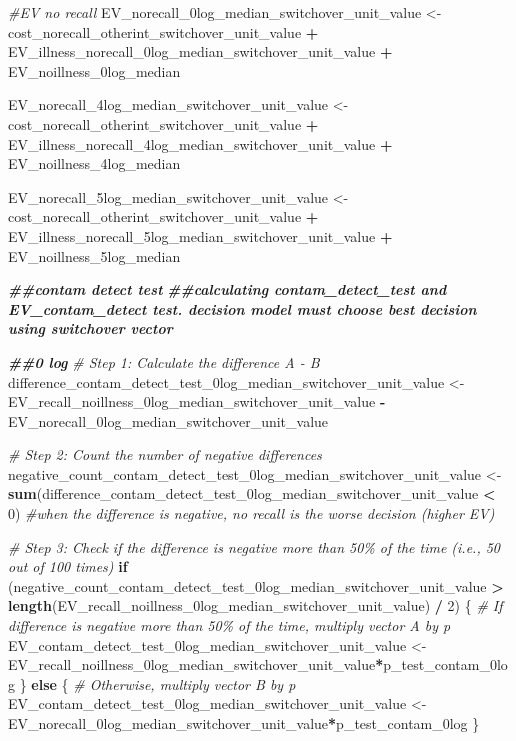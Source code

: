 \documentclass[
]{article}
\newenvironment{Shaded}{\begin{snugshade}}{\end{snugshade}}
\newcommand{\CommentTok}[1]{\textcolor[rgb]{0.56,0.35,0.01}{\textit{#1}}}
\newcommand{\ControlFlowTok}[1]{\textcolor[rgb]{0.13,0.29,0.53}{\textbf{#1}}}
\newcommand{\DecValTok}[1]{\textcolor[rgb]{0.00,0.00,0.81}{#1}}
\newcommand{\DocumentationTok}[1]{\textcolor[rgb]{0.56,0.35,0.01}{\textbf{\textit{#1}}}}
\newcommand{\FunctionTok}[1]{\textcolor[rgb]{0.13,0.29,0.53}{\textbf{#1}}}
\newcommand{\NormalTok}[1]{#1}
\newcommand{\OtherTok}[1]{\textcolor[rgb]{0.56,0.35,0.01}{#1}}
\newcommand{\SpecialCharTok}[1]{\textcolor[rgb]{0.81,0.36,0.00}{\textbf{#1}}}
\begin{document}
\begin{Shaded}
\begin{Highlighting}[]
\CommentTok{\#EV no recall}
\NormalTok{EV\_norecall\_0log\_median\_switchover\_unit\_value }\OtherTok{\textless{}{-}}\NormalTok{ cost\_norecall\_otherint\_switchover\_unit\_value }\SpecialCharTok{+}\NormalTok{ EV\_illness\_norecall\_0log\_median\_switchover\_unit\_value }\SpecialCharTok{+}\NormalTok{ EV\_noillness\_0log\_median}

\NormalTok{EV\_norecall\_4log\_median\_switchover\_unit\_value }\OtherTok{\textless{}{-}}\NormalTok{ cost\_norecall\_otherint\_switchover\_unit\_value }\SpecialCharTok{+}\NormalTok{ EV\_illness\_norecall\_4log\_median\_switchover\_unit\_value }\SpecialCharTok{+}\NormalTok{ EV\_noillness\_4log\_median}

\NormalTok{EV\_norecall\_5log\_median\_switchover\_unit\_value }\OtherTok{\textless{}{-}}\NormalTok{ cost\_norecall\_otherint\_switchover\_unit\_value }\SpecialCharTok{+}\NormalTok{ EV\_illness\_norecall\_5log\_median\_switchover\_unit\_value }\SpecialCharTok{+}\NormalTok{ EV\_noillness\_5log\_median}


\DocumentationTok{\#\#contam detect test}
\DocumentationTok{\#\#calculating contam\_detect\_test and EV\_contam\_detect test. decision model must choose best decision using switchover vector}

\DocumentationTok{\#\#0 log}
\CommentTok{\# Step 1: Calculate the difference A {-} B}
\NormalTok{difference\_contam\_detect\_test\_0log\_median\_switchover\_unit\_value }\OtherTok{\textless{}{-}}\NormalTok{ EV\_recall\_noillness\_0log\_median\_switchover\_unit\_value }\SpecialCharTok{{-}}\NormalTok{ EV\_norecall\_0log\_median\_switchover\_unit\_value}

\CommentTok{\# Step 2: Count the number of negative differences}
\NormalTok{negative\_count\_contam\_detect\_test\_0log\_median\_switchover\_unit\_value }\OtherTok{\textless{}{-}} \FunctionTok{sum}\NormalTok{(difference\_contam\_detect\_test\_0log\_median\_switchover\_unit\_value }\SpecialCharTok{\textless{}} \DecValTok{0}\NormalTok{) }\CommentTok{\#when the difference is negative, no recall is the worse decision (higher EV)}

\CommentTok{\# Step 3: Check if the difference is negative more than 50\% of the time (i.e., 50 out of 100 times)}
\ControlFlowTok{if}\NormalTok{ (negative\_count\_contam\_detect\_test\_0log\_median\_switchover\_unit\_value }\SpecialCharTok{\textgreater{}} \FunctionTok{length}\NormalTok{(EV\_recall\_noillness\_0log\_median\_switchover\_unit\_value) }\SpecialCharTok{/} \DecValTok{2}\NormalTok{) \{}
  \CommentTok{\# If difference is negative more than 50\% of the time, multiply vector A by p}
\NormalTok{  EV\_contam\_detect\_test\_0log\_median\_switchover\_unit\_value }\OtherTok{\textless{}{-}}\NormalTok{ EV\_recall\_noillness\_0log\_median\_switchover\_unit\_value}\SpecialCharTok{*}\NormalTok{p\_test\_contam\_0log}
\NormalTok{\} }\ControlFlowTok{else}\NormalTok{ \{}
  \CommentTok{\# Otherwise, multiply vector B by p}
\NormalTok{ EV\_contam\_detect\_test\_0log\_median\_switchover\_unit\_value  }\OtherTok{\textless{}{-}}\NormalTok{ EV\_norecall\_0log\_median\_switchover\_unit\_value}\SpecialCharTok{*}\NormalTok{p\_test\_contam\_0log}
\NormalTok{\}}



\end{Highlighting}
\end{Shaded}
\end{document}
